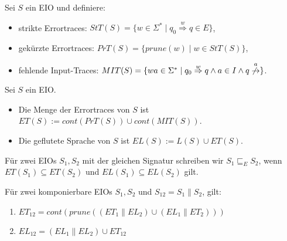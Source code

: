 \begin{Def}[Errortraces]
  \label{DefErrortraces}
  Sei $S$ ein EIO und definiere:
  \begin{itemize}
    \item strikte Errortraces: $StT(S)=\{w\in\Sigma
      ^*\mid q_0\overset{w}{\Rightarrow}q\in E\}$,
    \item gekürzte Errortraces: $PrT(S)=\{prune(w)\mid w\in StT(S)\}$,
    \item fehlende Input-Traces: $MIT(S)=\{wa\in\Sigma ^*\mid
      q_0\overset{w}{\Rightarrow}q\wedge a\in I\wedge
    q\overset{a}{\not{\hspace{-0.1cm}\rightarrow}}\}$.
  \end{itemize}
\end{Def}

\begin{Def}
  \label{DefETEL}
  Sei $S$ ein EIO.
  \begin{itemize}
    \item Die Menge der Errortraces von $S$ ist $ET(S):=cont(PrT(S))\cup
      cont(MIT(S))$.
    \item Die geflutete Sprache von $S$ ist $EL(S):=L(S)\cup ET(S)$.
  \end{itemize}
  Für zwei EIOs $S_1, S_2$ mit der gleichen Signatur schreiben wir
  $S_1\sqsubseteq _E S_2$, wenn $ET(S_1)\subseteq ET(S_2)$ und
  $EL(S_1)\subseteq EL(S_2)$ gilt.
\end{Def}

\begin{satz}
  \label{satzErrorSemanik}
  Für zwei komponierbare EIOs $S_1, S_2$ und $S_{12}=S_1\|S_2$, gilt:
  \begin{enumerate}
    \item $ET_{12}=cont(prune((ET_1\|EL_2)\cup(EL_1\|ET_2)))$
    \item $EL_{12}=(EL_1\|EL_2)\cup ET_{12}$
  \end{enumerate}
\end{satz}

